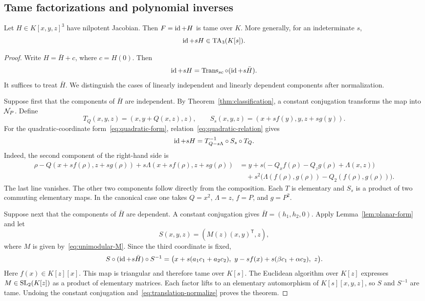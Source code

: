 \subsection{Tame factorizations and polynomial inverses}
\begin{theorem}[Tameness]\label{thm1}
Let $H\in K[x,y,z]^3$ have nilpotent Jacobian. Then $F=\operatorname{id}+H$ is tame over $K$. More generally, for an indeterminate $s$,
\[
 \operatorname{id}+sH\in\operatorname{TA}_3(K[s]).
\]
\end{theorem}

\begin{proof}
Write $H=\bar H+c$, where $c=H(0)$. Then
\begin{equation}\label{eq:translation-normalize}
 \operatorname{id}+sH=\operatorname{Trans}_{sc}\circ(\operatorname{id}+s\bar H).
\end{equation}
It suffices to treat $\bar H$. We distinguish the cases of linearly independent and linearly dependent components after normalization.

Suppose first that the components of $\bar H$ are independent. By Theorem~\ref{thm:classification}, a constant conjugation transforms the map into $\mathcal N_P$. Define
\[
 T_Q(x,y,z)=(x,y+Q(x,z),z),\qquad
 S_s(x,y,z)=(x+sf(y),y,z+sg(y)).
\]
For the quadratic-coordinate form~\eqref{eq:quadratic-form}, relation~\eqref{eq:quadratic-relation} gives
\begin{equation}\label{eq:tame-factorization}
 \operatorname{id}+sH=T_{Q-s\Lambda}^{-1}\circ S_s\circ T_Q.
\end{equation}
Indeed, the second component of the right-hand side is
\begin{align*}
 \rho-Q(x+sf(\rho),z+sg(\rho))+s\Lambda(x+sf(\rho),z+sg(\rho))
 &=y+s\bigl(-Q_xf(\rho)-Q_zg(\rho)+\Lambda(x,z)\bigr)\\
 &\quad+s^2\bigl(\Lambda(f(\rho),g(\rho))-Q_2(f(\rho),g(\rho))\bigr).
\end{align*}
The last line vanishes. The other two components follow directly from the composition. Each $T$ is elementary and $S_s$ is a product of two commuting elementary maps. In the canonical case one takes $Q=x^2$, $\Lambda=z$, $f=P$, and $g=P^2$.

Suppose next that the components of $\bar H$ are dependent. A constant conjugation gives $\bar H=(h_1,h_2,0)$. Apply Lemma~\ref{lem:planar-form} and let
\[
 S(x,y,z)=(M(z)(x,y)^{\mathsf T},z),
\]
where $M$ is given by~\eqref{eq:unimodular-M}. Since the third coordinate is fixed,
\begin{equation}\label{eq:dependent-tame-conjugate}
 S\circ(\operatorname{id}+s\bar H)\circ S^{-1}
 =\bigl(x+s(a_1c_1+a_2c_2),\
 y-sf(x)+s(\beta c_1+\alpha c_2),\ z\bigr).
\end{equation}
Here $f(x)\in K[z][x]$. This map is triangular and therefore tame over $K[s]$. The Euclidean algorithm over $K[z]$ expresses $M\in\operatorname{SL}_2(K[z])$ as a product of elementary matrices. Each factor lifts to an elementary automorphism of $K[s][x,y,z]$, so $S$ and $S^{-1}$ are tame. Undoing the constant conjugation and~\eqref{eq:translation-normalize} proves the theorem.
\end{proof}

